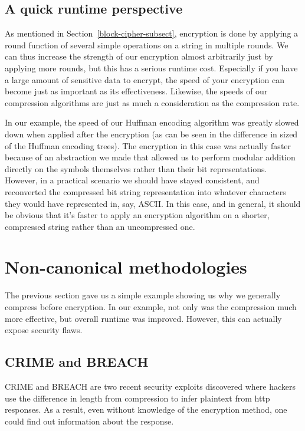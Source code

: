 \documentclass[11pt]{article}
\newcommand\genref{}
\newcommand\sectref{}
\def\genref#1#2{#1~\ref{#2}}
\def\sectref#1{\genref{Section}{#1}}
\begin{document}
\subsection{A quick runtime perspective}\label{runtime-subsect}
As mentioned in \sectref{block-cipher-subsect}, encryption is done by applying a round function of several simple operations 
on a string in multiple rounds. We can thus increase the strength of our encryption almost arbitrarily 
just by applying more rounds, but this has a serious runtime cost. Especially if you have a large amount of sensitive data to 
encrypt, the speed of your encryption can become just as important as its effectiveness. Likewise, the speeds of our 
compression algorithms are just as much a consideration as the compression rate.

In our example, the speed of our 
Huffman encoding algorithm was greatly slowed down when applied after the encryption (as can be seen in the difference in 
sized of the Huffman encoding trees). The encryption in this case was actually faster because of an abstraction we 
made that allowed us to perform modular addition directly on the symbols themselves rather than their bit representations. 
However, in a practical scenario we should have stayed consistent, and reconverted the compressed bit string 
representation into whatever characters they would have 
represented in, say, ASCII. In this case, and in general, it should be obvious that it's faster to apply 
an encryption algorithm on a shorter, compressed string rather than an uncompressed one. 

\section{Non-canonical methodologies}\label{non-canon-sect}
The previous section gave us a simple example showing us why we generally compress before encryption. 
In our example, not only was the compression much more effective, but overall runtime was improved. 
However, this can actually expose security flaws. 

\subsection{CRIME and BREACH}\label{crime-breach-subsect}
CRIME and BREACH\cite{kelsey, gluck} are two recent security exploits discovered where hackers use the 
difference in length from compression to infer plaintext from http responses. As a result, even without 
knowledge of the encryption method, one could find out information about the response.
\end{document}
